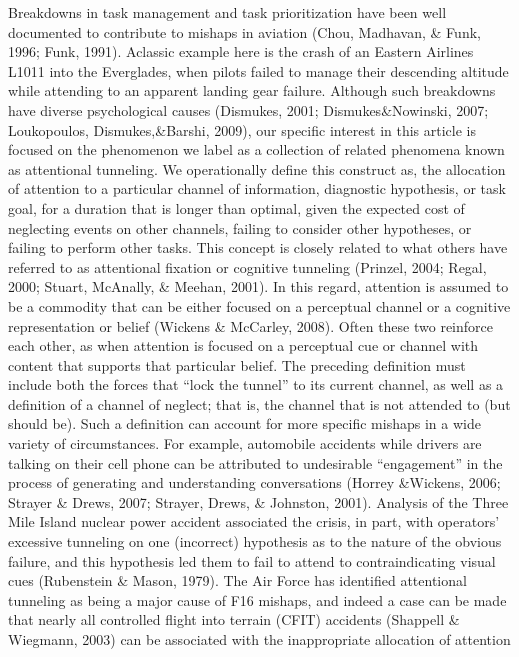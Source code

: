 \documentclass[utf8,bachelor,manualbib]{gradu3}
\begin{document}
Breakdowns in task management and task prioritization have been well documented
to contribute to mishaps in aviation (Chou, Madhavan, \& Funk, 1996; Funk, 1991).
Aclassic example here is the crash of an Eastern Airlines L1011 into the Everglades,
when pilots failed to manage their descending altitude while attending to an apparent
landing gear failure. Although such breakdowns have diverse psychological causes
(Dismukes, 2001; Dismukes\&Nowinski, 2007; Loukopoulos, Dismukes,\&Barshi,
2009), our specific interest in this article is focused on the phenomenon we label as a
collection of related phenomena known as attentional tunneling. We operationally
define this construct as, the allocation of attention to a particular channel of information,
diagnostic hypothesis, or task goal, for a duration that is longer than optimal,
given the expected cost of neglecting events on other channels, failing to consider
other hypotheses, or failing to perform other tasks. This concept is closely related to
what others have referred to as attentional fixation or cognitive tunneling (Prinzel,
2004; Regal, 2000; Stuart, McAnally, \& Meehan, 2001). In this regard, attention is assumed to be a commodity that can be either focused on a perceptual channel or a
cognitive representation or belief (Wickens \& McCarley, 2008). Often these two reinforce
each other, as when attention is focused on a perceptual cue or channel with
content that supports that particular belief.
The preceding definition must include both the forces that “lock the tunnel” to
its current channel, as well as a definition of a channel of neglect; that is, the channel
that is not attended to (but should be). Such a definition can account for more
specific mishaps in a wide variety of circumstances. For example, automobile accidents
while drivers are talking on their cell phone can be attributed to undesirable
“engagement” in the process of generating and understanding conversations (Horrey
\&Wickens, 2006; Strayer \& Drews, 2007; Strayer, Drews, \& Johnston, 2001).
Analysis of the Three Mile Island nuclear power accident associated the crisis, in
part, with operators’ excessive tunneling on one (incorrect) hypothesis as to the nature
of the obvious failure, and this hypothesis led them to fail to attend to contraindicating
visual cues (Rubenstein \& Mason, 1979). The Air Force has identified
attentional tunneling as being a major cause of F16 mishaps, and indeed a case can
be made that nearly all controlled flight into terrain (CFIT) accidents (Shappell \&
Wiegmann, 2003) can be associated with the inappropriate allocation of attention
\end{document}
